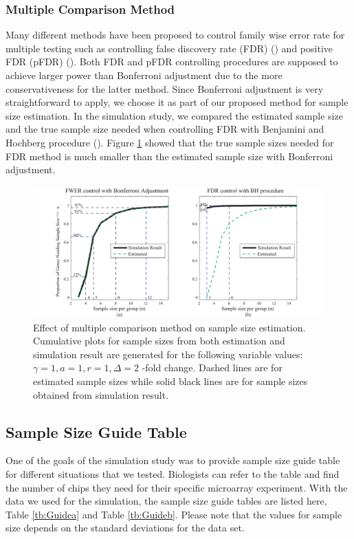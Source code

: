 \documentclass{bioinfo}
\begin{document}
\subsubsection{Multiple Comparison Method}

Many different methods have been proposed to control family wise
error rate for multiple testing such as controlling false
discovery rate (FDR) (\citealp{Benjamini95}) and positive FDR
(pFDR) (\citealp{Storey02}). Both FDR and pFDR controlling
procedures are supposed to achieve larger power than Bonferroni
adjustment due to the more conservativeness for the latter method.
Since Bonferroni adjustment is very straightforward to apply, we
choose it as part of our proposed method for sample size
estimation. In the simulation study, we compared the estimated
sample size and the true sample size needed when controlling FDR
with Benjamini and Hochberg procedure (\citealp{Benjamini95}).
Figure \ref{fig:ResMtd} showed that the true sample sizes needed
for FDR method is much smaller than the estimated sample size with
Bonferroni adjustment.

\begin{figure}[h]
  \centerline{\includegraphics*[width=3.5 in]{ResMtd.pdf}}
  \caption[Effect of multiple comparison method on sample size estimation]
  {Effect of multiple comparison method on sample size estimation.
    Cumulative plots for sample sizes from both estimation and
    simulation result are generated for the following variable values: $\gamma = 1, a = 1, r = 1,
    \Delta = 2$ -fold change. Dashed lines are for estimated sample sizes
    while solid black lines are for sample sizes obtained from simulation result.}
  \label{fig:ResMtd}
\end{figure}


\subsection{Sample Size Guide Table}

One of the goals of the simulation study was to provide sample
size guide table for different situations that we tested.
Biologists can refer to the table and find the number of chips
they need for their specific microarray experiment. With the data
we used for the simulation, the sample size guide tables are
listed here, Table \ref{tb:Guidea} and Table \ref{tb:Guideb}.
Please note that the values for sample size depends on the
standard deviations for the data set.
\end{document}
